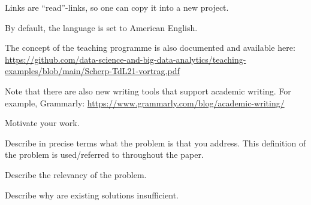 \documentclass[sigconf, review, nonacm]{acmart}
\begin{document}



Links are ``read''-links, so one can copy it into a new project.

By default, the language is set to American English.

The concept of the teaching programme is also documented and available here:
\url{https://github.com/data-science-and-big-data-analytics/teaching-examples/blob/main/Scherp-TdL21-vortrag.pdf}

Note that there are also new writing tools that support academic writing. 
For example, Grammarly: \url{https://www.grammarly.com/blog/academic-writing/}

\label{sec:introduction}




Motivate your work.



Describe in precise terms what the problem is that you address. 
This definition of the problem is used/referred to throughout the paper.


Describe the relevancy of the problem. 


Describe why are existing solutions insufficient.
\end{document}
